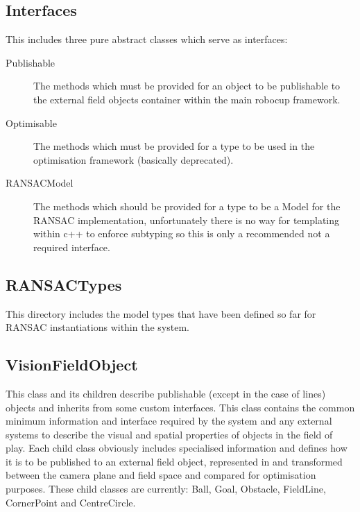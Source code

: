 \documentclass[]{report}
\begin{document}
\subsection{Interfaces}
This includes three pure abstract classes which serve as interfaces:
\begin{description}
\item[Publishable] The methods which must be provided for an object to be publishable to the external field objects container within the main robocup framework.
\item[Optimisable] The methods which must be provided for a type to be used in the optimisation framework (basically deprecated).
\item[RANSACModel] The methods which should be provided for a type to be a Model for the RANSAC implementation, unfortunately there is no way for templating within c++ to enforce subtyping so this is only a recommended not a required interface.
\end{description}
\subsection{RANSACTypes}
This directory includes the model types that have been defined so far for RANSAC instantiations within the system.
\subsection{VisionFieldObject}
This class and its children describe publishable (except in the case of lines) objects and inherits from some custom interfaces. This class contains the common minimum information and interface required by the system and any external systems to describe the visual and spatial properties of objects in the field of play. Each child class obviously includes specialised information and defines how it is to be published to an external field object, represented in and transformed between the camera plane and field space and compared for optimisation purposes. These child classes are currently: Ball, Goal, Obstacle, FieldLine, CornerPoint and CentreCircle.
\end{document}
